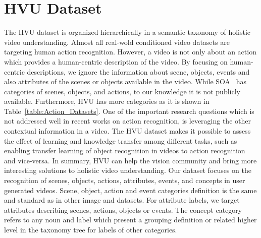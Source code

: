 \documentclass[runningheads]{llncs}
\begin{document}
\section{HVU Dataset}


\iffalse
\begin{figure*}[t]
\resizebox{17cm}{!}{
    \centering
    \texttt{[image: latex/HVU\_Dataset/chart\_top30\_tags.pdf]}}
    \vspace{-0.35cm}
    \caption{Histogram of \#annotations for the top 30 tags in HVU.}
    \label{fig:Chart_top30}
\end{figure*}
\fi


The HVU dataset is organized hierarchically in a semantic taxonomy of holistic video understanding. Almost all real-wold conditioned video datasets are targeting human action recognition. However, a video is not only about an action which provides a human-centric description of the video. By focusing on human-centric descriptions, we ignore the information about scene, objects, events and also attributes of the scenes or objects available in the video. 
While SOA~\cite{soadata} 
has categories of scenes, objects, and actions, to our knowledge it is not publicly available. 
Furthermore, HVU 
has more categories as it is shown in Table~\ref{table:Action_Datasets}. 
 One of the important research questions which is not addressed well in recent works on action recognition, is leveraging the other contextual information in a video. 
The HVU dataset makes it possible to assess the effect of learning and knowledge transfer among different tasks, such as enabling transfer learning of  object recognition in videos to action recognition and vice-versa.
In summary, HVU can help the vision community and bring more interesting solutions to holistic video understanding. Our dataset focuses on the recognition of scenes, objects, actions, attributes, events, and concepts in user generated videos. Scene, object, action and event categories definition is the same and standard as in other image and datasets. For attribute labels, we target attributes describing scenes, actions, objects or events. The concept category refers to any noun and label which present a grouping definition or related higher level in the taxonomy tree for labels of other categories.
\end{document}
